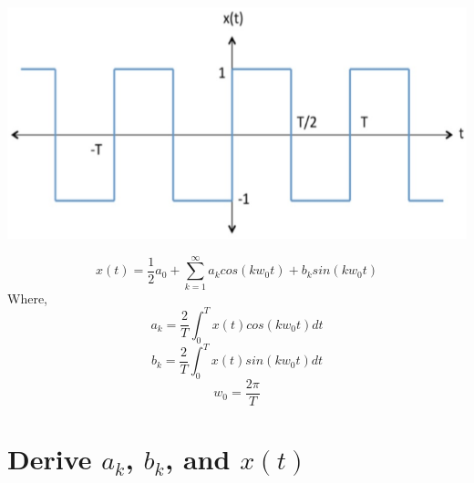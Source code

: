 \documentclass[12pt]{report}
\begin{document}
\begin{center}
		\includegraphics[scale = 0.6]{Lab 8 - Plots/Prelab.png}\\[1.0 cm]
\end{center}
\begin{equation}
	x(t) = \frac{1}{2}a_0 + \sum_{k=1}^{\infty}a_kcos(kw_0t) + b_ksin(kw_0t)
	\end{equation}
Where, \\
\begin{equation}
	a_k = \frac{2}{T}\int_{0}^{T}x(t)cos(kw_0t)dt
\end{equation}
\begin{equation}
	b_k = \frac{2}{T}\int_{0}^{T}x(t)sin(kw_0t)dt
\end{equation}
\begin{equation}
	w_0 = \frac{2\pi}{T}
\end{equation}
	
\section{Derive $ a_k $, $ b_k $, and $ x(t) $}
	
\end{document}
